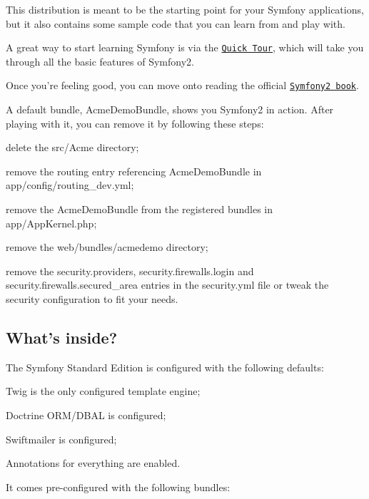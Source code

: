This distribution is meant to be the starting point for your Symfony applications, but it also contains some sample code that you can learn from and play with.

A great way to start learning Symfony is via the \href{http://symfony.com/doc/2.3/quick_tour/the_big_picture.html}{\tt Quick Tour}, which will take you through all the basic features of Symfony2.

Once you're feeling good, you can move onto reading the official \href{http://symfony.com/doc/2.3/index.html}{\tt Symfony2 book}.

A default bundle, {\ttfamily Acme\+Demo\+Bundle}, shows you Symfony2 in action. After playing with it, you can remove it by following these steps\+:


\begin{DoxyItemize}
\item delete the {\ttfamily src/\+Acme} directory;
\item remove the routing entry referencing Acme\+Demo\+Bundle in {\ttfamily app/config/routing\+\_\+dev.\+yml};
\item remove the Acme\+Demo\+Bundle from the registered bundles in {\ttfamily app/\+App\+Kernel.\+php};
\item remove the {\ttfamily web/bundles/acmedemo} directory;
\item remove the {\ttfamily security.\+providers}, {\ttfamily security.\+firewalls.\+login} and {\ttfamily security.\+firewalls.\+secured\+\_\+area} entries in the {\ttfamily security.\+yml} file or tweak the security configuration to fit your needs.
\end{DoxyItemize}

\subsection*{What's inside? }

The Symfony Standard Edition is configured with the following defaults\+:


\begin{DoxyItemize}
\item Twig is the only configured template engine;
\item Doctrine O\+R\+M/\+D\+B\+A\+L is configured;
\item Swiftmailer is configured;
\item Annotations for everything are enabled.
\end{DoxyItemize}

It comes pre-\/configured with the following bundles\+:



